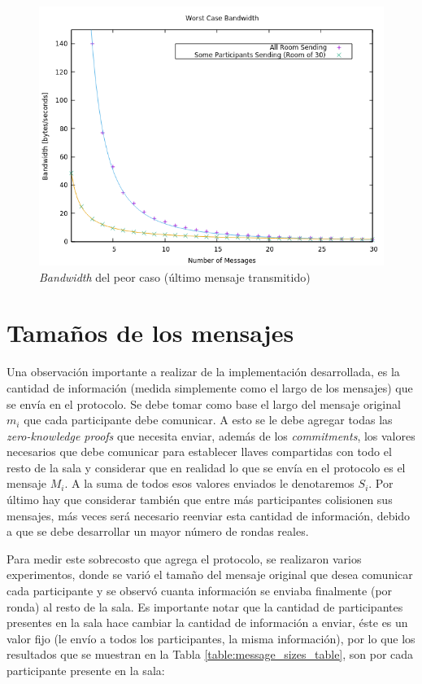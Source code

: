 \begin{figure}[H]
  \centering
    \includegraphics[scale=0.7]{logs/bandwidth.png}
  \caption{\emph{Bandwidth} del peor caso (último mensaje transmitido)}
  \label{fig:times-variable}
\end{figure}

\section{Tamaños de los mensajes}

Una observación importante a realizar de la implementación desarrollada, es la 
cantidad de información (medida simplemente como el largo de los mensajes) que 
se envía en el protocolo. Se debe tomar como base el largo del mensaje 
original $m_i$ que cada participante debe comunicar. A esto se le debe agregar 
todas las \emph{zero-knowledge proofs} que necesita enviar, además de los 
\emph{commitments}, los valores necesarios que debe comunicar para establecer 
llaves compartidas con todo el resto de la sala y considerar que en realidad 
lo que se envía en el protocolo es el mensaje $M_i$. A la suma de todos esos 
valores enviados le denotaremos $S_i$. Por último hay que considerar también 
que entre más participantes colisionen sus mensajes, más veces será necesario 
reenviar esta cantidad de información, debido a que se debe desarrollar un 
mayor número de rondas reales.

Para medir este sobrecosto que agrega el protocolo, se realizaron varios 
experimentos, donde se varió el tamaño del mensaje original que desea 
comunicar cada participante y se observó cuanta información se enviaba 
finalmente (por ronda) al resto de la sala. Es importante notar que la 
cantidad de participantes presentes en la sala hace cambiar la cantidad de 
información a enviar, éste es un valor fijo (le envío a todos los 
participantes, la misma información), por lo que los resultados que se 
muestran en la Tabla \ref{table:message_sizes_table}, son por cada 
participante presente en la sala:

